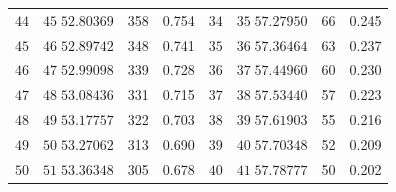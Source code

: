 \begin{center}
\begin{tabular}{|r|r|r|r||r|r|r|r|}
\(44\)&\(45\;52.80369\)&358&0.754&\(34\)&\(35\;57.27950\)&66&0.245\\
\(45\)&\(46\;52.89742\)&348&0.741&\(35\)&\(36\;57.36464\)&63&0.237\\
\(46\)&\(47\;52.99098\)&339&0.728&\(36\)&\(37\;57.44960\)&60&0.230\\
\(47\)&\(48\;53.08436\)&331&0.715&\(37\)&\(38\;57.53440\)&57&0.223\\
\(48\)&\(49\;53.17757\)&322&0.703&\(38\)&\(39\;57.61903\)&55&0.216\\
\(49\)&\(50\;53.27062\)&313&0.690&\(39\)&\(40\;57.70348\)&52&0.209\\
\(50\)&\(51\;53.36348\)&305&0.678&\(40\)&\(41\;57.78777\)&50&0.202\\
\hline
\end{tabular}
\end{center}
\endgroup

